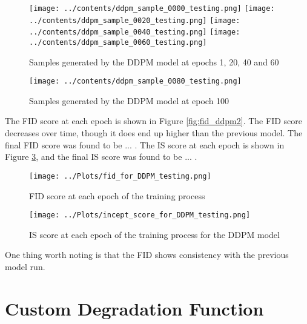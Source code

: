 \documentclass[12pt]{report} %
\begin{document}
\begin{figure}[h]
  \centering
  \texttt{[image: ../contents/ddpm\_sample\_0000\_testing.png]}
  \texttt{[image: ../contents/ddpm\_sample\_0020\_testing.png]}
  \texttt{[image: ../contents/ddpm\_sample\_0040\_testing.png]}
  \texttt{[image: ../contents/ddpm\_sample\_0060\_testing.png]}
  \caption{Samples generated by the DDPM model at epochs 1, 20, 40 and 60}
  \label{fig:ddpm_samples2}
\end{figure}


\begin{figure}[h]
  \centering
  \texttt{[image: ../contents/ddpm\_sample\_0080\_testing.png]}
  \caption{Samples generated by the DDPM model at epoch 100}
  \label{fig:ddpm_samples3}
\end{figure}

The FID score at each epoch is shown in Figure \ref{fig:fid_ddpm2}. The FID score decreases over time, though it does end up higher than the previous model. The final FID score was found to be ... . The IS score at each epoch is shown in Figure \ref{fig:is_ddpm2}, and the final IS score was found to be ... .

\begin{figure}[h]
  \centering
  \texttt{[image: ../Plots/fid\_for\_DDPM\_testing.png]}
  \caption{FID score at each epoch of the training process}
  \label{fig:fid_ddpm2}

  \texttt{[image: ../Plots/incept\_score\_for\_DDPM\_testing.png]}
  \caption{IS score at each epoch of the training process for the DDPM model}
  \label{fig:is_ddpm2}
\end{figure}

One thing worth noting is that the FID shows consistency with the previous model run.



\chapter{Custom Degradation Function}
\end{document}
